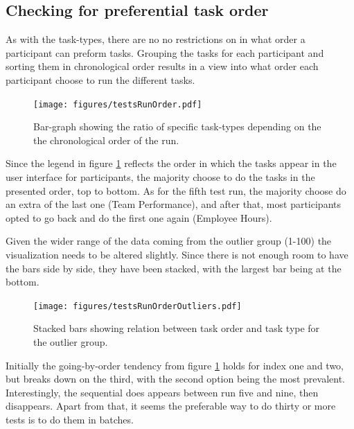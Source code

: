 \documentclass[nofilelist,dvipsnames]{cslthse-msc}
\begin{document}
      \subsection{Checking for preferential task order}

        As with the task-types, there are no no restrictions on in what order a
        participant can preform tasks. Grouping the tasks for each participant
        and sorting them in chronological order results in a view into what
        order each participant choose to run the different tasks.

				\begin{figure}[ht!]
					\centering
					\texttt{[image: figures/testsRunOrder.pdf]}
          \caption{
            Bar-graph showing the ratio of specific task-types depending on the
            the chronological order of the run.
          }
          \label{label_testsRunOrder}
        \end{figure}

        Since the legend in figure \ref{label_testsRunOrder} reflects the order
        in which the tasks appear in the user interface for participants, the
        majority choose to do the tasks in the presented order, top to bottom.
        As for the fifth test run, the majority choose do an extra of the last
        one (Team Performance), and after that, most participants opted to go
        back and do the first one again (Employee Hours).

        Given the wider range of the data coming from the outlier group (1-100)
        the visualization needs to be altered slightly. Since there is not
        enough room to have the bars side by side, they have been stacked, with
        the largest bar being at the bottom.
				\begin{figure}[ht!]
					\centering
					\texttt{[image: figures/testsRunOrderOutliers.pdf]}
          \caption{
            Stacked bars showing relation between task order and task type for
            the outlier group.
          }
				\end{figure}

        Initially the going-by-order tendency from figure
        \ref{label_testsRunOrder} holds for index one and two, but breaks down
        on the third, with the second option being the most prevalent.
        Interestingly, the sequential does appears between run five and nine,
        then disappears. Apart from that, it seems the preferable way to do
        thirty or more tests is to do them in batches.
\end{document}
